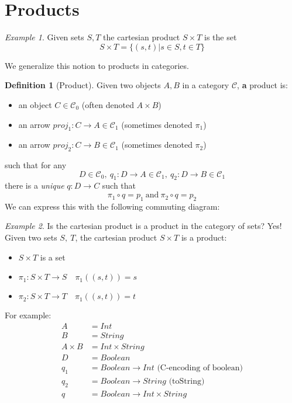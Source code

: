 \documentclass[fleqn]{scrartcl}
\newcommand{\cat}[1]{\mathcal{#1}}
\theoremstyle{definition} \newtheorem{definition}{Definition}
\theoremstyle{remark} \newtheorem{example}{Example}
\begin{document}
\section{Products}

\begin{example}
  Given sets $S, T$ the cartesian product $S \times T$ is the set
  \[ S \times T = \{ (s, t) | s \in S, t \in T \} \]
\end{example}

We generalize this notion to products in categories.

\begin{definition}[Product]
  Given two objects $A, B$ in a category $\cat{C}$, \textbf{a} product is:
  \begin{itemize}
  \item an object $C \in \cat{C}_0$ (often denoted $A \times B$)
  \item an arrow $proj_1 : C \to A \in \cat{C}_1$ (sometimes denoted $\pi_1$)
  \item an arrow $proj_2 : C \to B \in \cat{C}_1$ (sometimes denoted $\pi_2$)
  \end{itemize}
  such that for any 
  \[ D \in \cat{C}_0,\ q_1 : D \to A \in \cat{C}_1,\ q_2 : D \to B \in
  \cat{C}_1 \]
  there is a \emph{unique} $q : D \to C$ such that
  \[ \pi_1 \circ q = p_1 \ \mathrm{and} \ \pi_2 \circ q = p_2 \]
  We can express this with the following commuting diagram:

\end{definition}

\begin{example}
Is the cartesian product is a product in the category of sets? Yes!\\
Given two sets $S,\ T$, the cartesian product $S \times T$ is a
product:

\begin{itemize}
\item $S \times T$ is a set
\item $\pi_1 : S \times T \to S \quad \pi_1((s, t)) = s$
\item $\pi_2 : S \times T \to T \quad \pi_1((s, t)) = t$
\end{itemize}

For example:
\begin{align*}
A &= Int\\
B &= String\\
A \times B &= Int \times String\\
D &= Boolean\\
q_1 &= Boolean \to Int \textrm{ (C-encoding of boolean)}\\
q_2 &= Boolean \to String \textrm{ (toString)}\\
q &= Boolean \to Int \times String
\end{align*}
\end{example}
\end{document}
